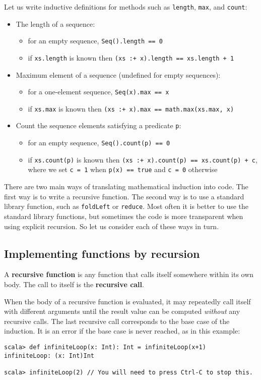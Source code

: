 Let us write inductive definitions for methods such as \lstinline!length!,
\lstinline!max!, and \lstinline!count!:
\begin{itemize}
\item The length of a sequence:
\begin{itemize}
\item for an empty sequence, \lstinline!Seq().length == 0!
\item if \lstinline!xs.length! is known then \lstinline!(xs :+ x).length == xs.length + 1!
\end{itemize}
\item Maximum element of a sequence (undefined for empty sequences):
\begin{itemize}
\item for a one-element sequence, \lstinline!Seq(x).max == x! 
\item if \lstinline!xs.max! is known then \lstinline!(xs :+ x).max == math.max(xs.max, x)!
\end{itemize}
\item Count the sequence elements satisfying a predicate \lstinline!p!:
\begin{itemize}
\item for an empty sequence, \lstinline!Seq().count(p) == 0!
\item if \lstinline!xs.count(p)! is known then \lstinline!(xs :+ x).count(p) == xs.count(p) + c!,
where we set \lstinline!c = 1! when \lstinline!p(x) == true! and
\lstinline!c = 0! otherwise
\end{itemize}
\end{itemize}
There are two main ways of translating mathematical induction into
code. The first way is to write a recursive function. The second way
is to use a standard library function, such as \lstinline!foldLeft!
or \lstinline!reduce!. Most often it is better to use the standard
library functions, but sometimes the code is more transparent when
using explicit recursion. So let us consider each of these ways in
turn.

\subsection{Implementing functions by recursion}

A \textbf{recursive function} is any function
that calls itself somewhere within its own body. The call to itself
is the \textbf{recursive call}.

When the body of a recursive function is evaluated, it may repeatedly
call itself with different arguments until the result value can be
computed \emph{without} any recursive calls. The last recursive call
corresponds to the base case of the induction. It is an error if the
base case is never reached, as in this example:
\begin{lstlisting}
scala> def infiniteLoop(x: Int): Int = infiniteLoop(x+1)
infiniteLoop: (x: Int)Int

scala> infiniteLoop(2) // You will need to press Ctrl-C to stop this.
\end{lstlisting}

